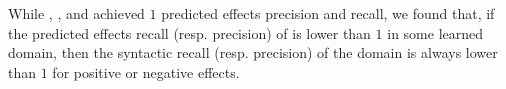 While \offlam, \samshort, and \nolam achieved $1$ predicted effects precision and recall, we found that, if the predicted effects recall (resp. precision) of \rosame is lower than $1$ in some learned domain, then the syntactic recall (resp. precision) of the domain is always lower than $1$ for positive or negative effects. 




